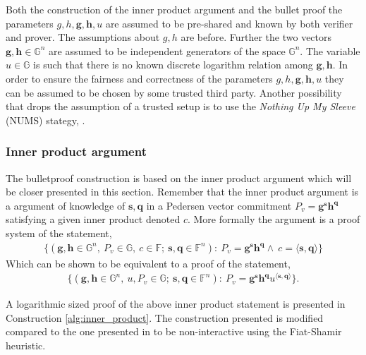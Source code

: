 Both the construction of the inner product argument and the bullet proof the parameters $g,h,\mathbf{g},\mathbf{h},u$ are assumed to be pre-shared and known by both verifier and prover. The assumptions about $g,h$ are before. Further the two vectors $\mathbf{g}, \mathbf{h} \in \mathds{G}^n$ are assumed to be independent generators of the space $\mathds{G}^n$. The variable $u\in\mathds{G}$ is such that there is no known discrete logarithm relation among $\mathbf{g},\mathbf{h}$. In order to ensure the fairness and correctness of the parameters $g,h,\mathbf{g},\mathbf{h},u$ they can be  assumed to be chosen by some trusted third party. Another possibility that drops the assumption of a trusted setup is to use the \textit{Nothing Up My Sleeve} (NUMS) stategy, \cite{ZKRP_Morais}.

\subsubsection*{Inner product argument}
\label{sec:inner_prod}
The bulletproof construction is based on the inner product argument which will be closer presented in this section. Remember that the inner product argument is a argument of knowledge of $\textbf{s},\mathbf{q}$ in a  Pedersen vector commitment $P_v=\mathbf{g}^\mathbf{s}\mathbf{h}^\mathbf{q}$ satisfying a given inner product denoted $c$. 
More formally the argument is a proof system of the statement,
\begin{align*}
    \{(\mathbf{g},\mathbf{h}\in\mathds{G}^n,\:P_v\in\mathds{G},\:c\in\mathds{F};\: \mathbf{s},\mathbf{q}\in\mathds{F}^n) : \: P_v=\mathbf{g}^\mathbf{s}\mathbf{h}^\mathbf{q}\wedge\: c =\langle\mathbf{s},\mathbf{q}\rangle\}
\end{align*}
Which can be shown to be equivalent to a proof of the statement,
\begin{align}
\label{eq:IPA}
    \{(\mathbf{g},\mathbf{h}\in\mathds{G}^n,\: u,P_v\in\mathds{G};\: \mathbf{s},\mathbf{q}\in\mathds{F}^n) : \: P_v=\mathbf{g}^\mathbf{s}\mathbf{h}^\mathbf{q}u^{\langle\mathbf{s},\mathbf{q}\rangle}\}.
\end{align}

A logarithmic sized proof of the above inner product statement is presented in Construction \ref{alg:inner_product}. The construction presented is modified compared to the one presented in \cite{bulletProofs_theory} to be non-interactive using the Fiat-Shamir heuristic.


